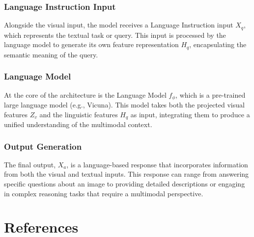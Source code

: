 \documentclass[12pt, conference, compsoc, onecolumn]{IEEEtran}
\begin{document}
	\subsubsection*{Language Instruction Input}
	Alongside the visual input, the model receives a Language Instruction input $X_q$, which represents the textual task or query. This input is processed by the language model to generate its own feature representation $H_q$, encapsulating the semantic meaning of the query.
	
	\subsubsection*{Language Model}
	At the core of the architecture is the Language Model $f_\phi$, which is a pre-trained large language model (e.g., Vicuna). This model takes both the projected visual features $Z_v$ and the linguistic features $H_q$ as input, integrating them to produce a unified understanding of the multimodal context.
	
	\subsubsection*{Output Generation}
	The final output, $X_a$, is a language-based response that incorporates information from both the visual and textual inputs. This response can range from answering specific questions about an image to providing detailed descriptions or engaging in complex reasoning tasks that require a multimodal perspective.
	
	
	\section*{References}
	\nocite{*}
	\printbibliography[heading=none]
	
	
	
\end{document}

